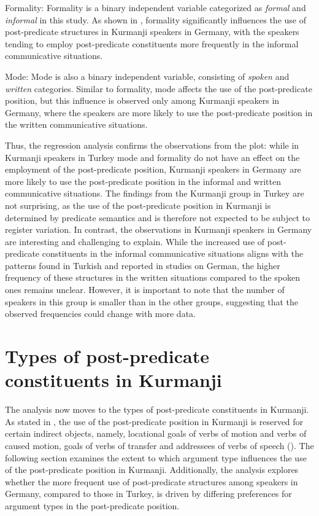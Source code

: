 Formality: Formality is a binary independent variable categorized as \textit{formal} and \textit{informal} in this study. As shown in , formality significantly influences the use of post-predicate structures in Kurmanji speakers in Germany, with the speakers tending to employ post-predicate constituents more frequently in the informal communicative situations.

Mode: Mode is also a binary independent variable, consisting of \textit{spoken} and \textit{written} categories. Similar to formality, mode affects the use of the post-predicate position, but this influence is observed only among Kurmanji speakers in Germany, where the speakers are more likely to use the post-predicate position in the written communicative situations.

Thus, the regression analysis confirms the observations from the plot: while in Kurmanji speakers in Turkey mode and formality do not have an effect on the employment of the post-predicate position, Kurmanji speakers in Germany are more likely to use the post-predicate position in the informal and written communicative situations. The findings from the Kurmanji group in Turkey are not surprising, as the use of the post-predicate position in Kurmanji is determined by predicate semantics and is therefore not expected to be subject to register variation. In contrast, the observations in Kurmanji speakers in Germany are interesting and challenging to explain. While the increased use of post-predicate constituents in the informal communicative situations aligns with the patterns found in Turkish and reported in studies on German, the higher frequency of these structures in the written situations compared to the spoken ones remains unclear. However, it is important to note that the number of speakers in this group is smaller than in the other groups, suggesting that the observed frequencies could change with more data.

\section{Types of post-predicate constituents in Kurmanji}\label{sec:key:6.3}

The analysis now moves to the types of post-predicate constituents in Kurmanji. As stated in , the use of the post-predicate position in Kurmanji is reserved for certain indirect objects, namely, locational goals of verbs of motion and verbs of caused motion, goals of verbs of transfer and addressees of verbs of speech (\citealt{Haig2014, HaigThiele2014, Haig2018, Gundogdu2019}). The following section examines the extent to which argument type influences the use of the post-predicate position in Kurmanji. Additionally, the analysis explores whether the more frequent use of post-predicate structures among speakers in Germany, compared to those in Turkey, is driven by differing preferences for argument types in the post-predicate position.

